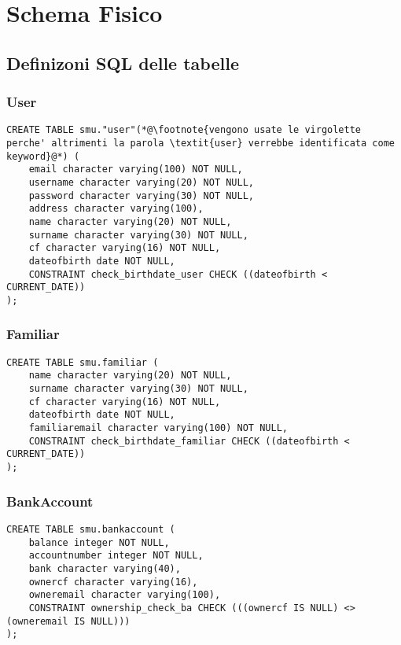 \chapter{Schema Fisico}

\section{Definizoni SQL delle tabelle}

\subsection{User}

\begin{lstlisting}
CREATE TABLE smu."user"(*@\footnote{vengono usate le virgolette perche' altrimenti la parola \textit{user} verrebbe identificata come keyword}@*) (
    email character varying(100) NOT NULL,
    username character varying(20) NOT NULL,
    password character varying(30) NOT NULL,
    address character varying(100),
    name character varying(20) NOT NULL,
    surname character varying(30) NOT NULL,
    cf character varying(16) NOT NULL,
    dateofbirth date NOT NULL,
    CONSTRAINT check_birthdate_user CHECK ((dateofbirth < CURRENT_DATE))
);
\end{lstlisting}

\subsection{Familiar}

\begin{lstlisting}
CREATE TABLE smu.familiar (
    name character varying(20) NOT NULL,
    surname character varying(30) NOT NULL,
    cf character varying(16) NOT NULL,
    dateofbirth date NOT NULL,
    familiaremail character varying(100) NOT NULL,
    CONSTRAINT check_birthdate_familiar CHECK ((dateofbirth < CURRENT_DATE))
);
\end{lstlisting}

\newpage

\subsection{BankAccount}

\begin{lstlisting}
CREATE TABLE smu.bankaccount (
    balance integer NOT NULL,
    accountnumber integer NOT NULL,
    bank character varying(40),
    ownercf character varying(16),
    owneremail character varying(100),
    CONSTRAINT ownership_check_ba CHECK (((ownercf IS NULL) <> (owneremail IS NULL)))
);
\end{lstlisting}

